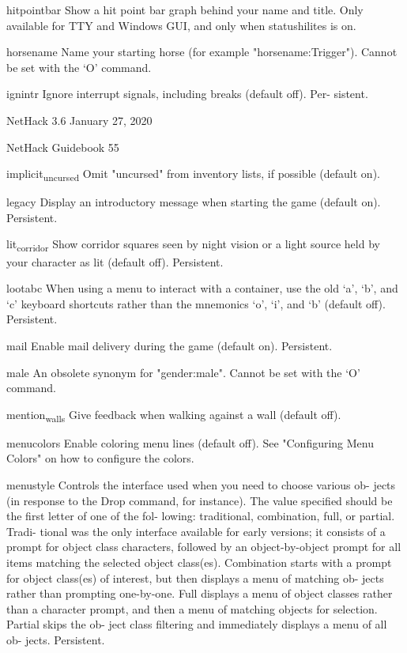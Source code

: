 \documentclass[11pt]{article}
\begin{document}
hitpointbar
 Show a hit point bar graph behind your name and title. Only
 available for TTY and Windows GUI, and only when statushilites
 is on.

horsename
 Name your starting horse (for example "horsename:Trigger").
 Cannot be set with the `O' command.

ignintr
 Ignore interrupt signals, including breaks (default off). Per-
 sistent.


NetHack 3.6                   January 27, 2020





NetHack Guidebook                       55



implicit\textsubscript{uncursed}
 Omit "uncursed" from inventory lists, if possible (default on).

legacy
 Display an introductory message when starting the game (default
 on). Persistent.

lit\textsubscript{corridor}
 Show corridor squares seen by night vision or a light source
 held by your character as lit (default off). Persistent.

lootabc
 When using a menu to interact with a container, use the old
 `a', `b', and `c' keyboard shortcuts rather than the mnemonics
 `o', `i', and `b' (default off). Persistent.

mail
 Enable mail delivery during the game (default on). Persistent.

male
 An obsolete synonym for "gender:male". Cannot be set with the
 `O' command.

mention\textsubscript{walls}
 Give feedback when walking against a wall (default off).

menucolors
 Enable coloring menu lines (default off).  See "Configuring
 Menu Colors" on how to configure the colors.

menustyle
 Controls the interface used when you need to choose various ob-
 jects (in response to the Drop command, for instance).  The
 value specified should be the first letter of one of the fol-
 lowing: traditional, combination, full, or partial.  Tradi-
 tional was the only interface available for early versions; it
 consists of a prompt for object class characters, followed by
 an object-by-object prompt for all items matching the selected
 object class(es). Combination starts with a prompt for object
 class(es) of interest, but then displays a menu of matching ob-
 jects rather than prompting one-by-one. Full displays a menu
 of object classes rather than a character prompt, and then a
 menu of matching objects for selection. Partial skips the ob-
 ject class filtering and immediately displays a menu of all ob-
 jects. Persistent.
\end{document}
